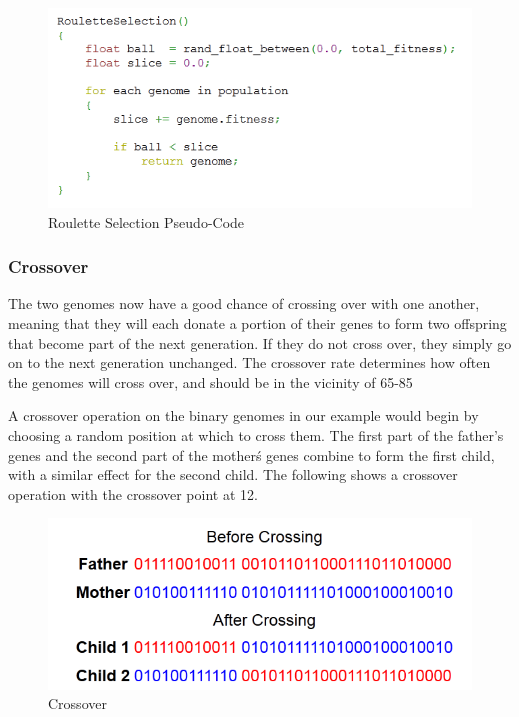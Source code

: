 \documentclass[12pt]{report}
\begin{document}
\begin{figure}[h!]
	\centering
		\includegraphics[scale=1.0]{roulette.png}
	\caption{Roulette Selection Pseudo-Code}
	\label{fig:ID3}
\end{figure}


\subsubsection{Crossover}
The two genomes now have a good chance of crossing over with one another, meaning that they will each donate a portion of their genes to form two offspring that become part of the next generation. If they do not cross over, they simply go on to the next generation unchanged. The crossover rate determines how often the genomes will cross over, and should be in the vicinity of 65-85%

A crossover operation on the binary genomes in our example would begin by choosing a random position at which to cross them. The first part of the father’s genes and the second part of the mother\'s genes combine to form the first child, with a similar effect for the second child. The following shows a crossover operation with the crossover point at 12. 

\begin{figure}[h!]
	\centering
		\includegraphics[scale=1]{crossover.png}
	\caption{Crossover}
	\label{fig:ID3}
\end{figure}
\end{document}

